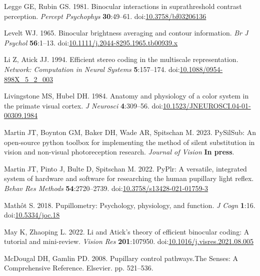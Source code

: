 \documentclass[
]{article}
\begin{document}
\leavevmode\hypertarget{ref-Legge1981}{}%
Legge GE, Rubin GS. 1981. Binocular interactions in suprathreshold contrast perception. \emph{Percept Psychophys} \textbf{30}:49--61. doi:\href{https://doi.org/10.3758/bf03206136}{10.3758/bf03206136}

\leavevmode\hypertarget{ref-Levelt1965}{}%
Levelt WJ. 1965. Binocular brightness averaging and contour information. \emph{Br J Psychol} \textbf{56}:1--13. doi:\href{https://doi.org/10.1111/j.2044-8295.1965.tb00939.x}{10.1111/j.2044-8295.1965.tb00939.x}

\leavevmode\hypertarget{ref-Li1994}{}%
Li Z, Atick JJ. 1994. Efficient stereo coding in the multiscale representation. \emph{Network: Computation in Neural Systems} \textbf{5}:157--174. doi:\href{https://doi.org/10.1088/0954-898X_5_2_003}{10.1088/0954-898X\_5\_2\_003}

\leavevmode\hypertarget{ref-Livingstone1984}{}%
Livingstone MS, Hubel DH. 1984. Anatomy and physiology of a color system in the primate visual cortex. \emph{J Neurosci} \textbf{4}:309--56. doi:\href{https://doi.org/10.1523/JNEUROSCI.04-01-00309.1984}{10.1523/JNEUROSCI.04-01-00309.1984}

\leavevmode\hypertarget{ref-Martin2023}{}%
Martin JT, Boynton GM, Baker DH, Wade AR, Spitschan M. 2023. PySilSub: An open-source python toolbox for implementing the method of silent substitution in vision and non-visual photoreception research. \emph{Journal of Vision} \textbf{In press}.

\leavevmode\hypertarget{ref-Martin2022}{}%
Martin JT, Pinto J, Bulte D, Spitschan M. 2022. PyPlr: A versatile, integrated system of hardware and software for researching the human pupillary light reflex. \emph{Behav Res Methods} \textbf{54}:2720--2739. doi:\href{https://doi.org/10.3758/s13428-021-01759-3}{10.3758/s13428-021-01759-3}

\leavevmode\hypertarget{ref-Mathot2018}{}%
Mathôt S. 2018. Pupillometry: Psychology, physiology, and function. \emph{J Cogn} \textbf{1}:16. doi:\href{https://doi.org/10.5334/joc.18}{10.5334/joc.18}

\leavevmode\hypertarget{ref-May2022}{}%
May K, Zhaoping L. 2022. Li and Atick's theory of efficient binocular coding: A tutorial and mini-review. \emph{Vision Res} \textbf{201}:107950. doi:\href{https://doi.org/10.1016/j.visres.2021.08.005}{10.1016/j.visres.2021.08.005}

\leavevmode\hypertarget{ref-McDougal2008}{}%
McDougal DH, Gamlin PD. 2008. Pupillary control pathways.The Senses: A Comprehensive Reference. Elsevier. pp. 521--536.
\end{document}
